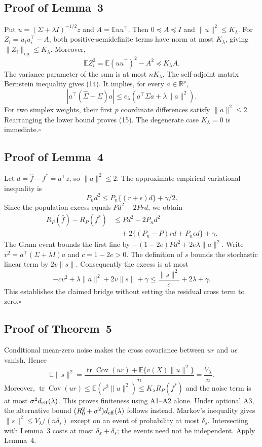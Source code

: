 \documentclass[pdflatex,sn-mathphys-ay]{sn-jnl}
\theoremstyle{remark}\newtheorem{remark}[theorem]{Remark}
\newcommand{\E}{\mathbb E}
\newcommand{\R}{\mathbb R}
\newcommand{\op}{\mathrm{op}}
\newcommand{\tr}{\operatorname{tr}}
\begin{document}
\subsection{Proof of Lemma~3}
Put $u=(\Sigma+\lambda I)^{-1/2}z$ and $A=\E uu^\top$. Then $0\preceq A\preceq I$ and $\|u\|^2\leq K_\lambda$. For $Z_i=u_iu_i^\top-A$, both positive-semidefinite terms have norm at most $K_\lambda$, giving $\|Z_i\|_{\op}\leq K_\lambda$. Moreover,
\[
 \E Z_i^2=\E(uu^\top)^2-A^2\preceq K_\lambda A.
\]
The variance parameter of the sum is at most $nK_\lambda$. The self-adjoint matrix Bernstein inequality \citep{tropp} gives (14). It implies, for every $a\in\R^p$,
\[
 |a^\top(\hat\Sigma-\Sigma)a|
 \leq e_\lambda(a^\top\Sigma a+\lambda\|a\|^2).
\]
For two simplex weights, their first $p$ coordinate differences satisfy $\|a\|^2\leq2$. Rearranging the lower bound proves (15). The degenerate case $K_\lambda=0$ is immediate.\hfill$\square$

\subsection{Proof of Lemma~4}
Let $d=\hat f-f^*=a^\top z$, so $\|a\|^2\leq2$. The approximate empirical variational inequality is
\[
 P_n d^2\leq P_n\{(r+\epsilon)d\}+\gamma/2.
\]
Since the population excess equals $Pd^2-2Prd$, we obtain
\begin{align*}
 R_P(\hat f)-R_P(f^*)
 &\leq Pd^2-2P_nd^2\\
 &\quad+2\{(P_n-P)rd+P_n\epsilon d\}+\gamma.
\end{align*}
The Gram event bounds the first line by
$-(1-2e)Pd^2+2e\lambda\|a\|^2$.
Write $v^2=a^\top(\Sigma+\lambda I)a$ and $c=1-2e>0$. The definition of $s$ bounds the stochastic linear term by $2v\|s\|$. Consequently the excess is at most
\[
 -cv^2+\lambda\|a\|^2+2v\|s\|+\gamma
 \leq\frac{\|s\|^2}{c}+2\lambda+\gamma.
\]
This establishes the claimed bridge without setting the residual cross term to zero.\hfill$\square$

\subsection{Proof of Theorem~5}
Conditional mean-zero noise makes the cross covariance between $ur$ and $u\epsilon$ vanish. Hence
\[
 \E\|s\|^2=\frac{\tr\operatorname{Cov}(ur)+\E\{v(X)\|u\|^2\}}{n}=\frac{V_\lambda}{n}.
\]
Moreover, $\tr\operatorname{Cov}(ur)\leq\E(r^2\|u\|^2)\leq K_\lambda R_P(f^*)$ and the noise term is at most $\sigma^2d_{\rm eff}(\lambda)$. This proves finiteness using A1--A2 alone. Under optional A3, the alternative bound $(R_0^2+\sigma^2)d_{\rm eff}(\lambda)$ follows instead. Markov's inequality gives $\|s\|^2\leq V_\lambda/(n\delta_s)$ except on an event of probability at most $\delta_s$. Intersecting with Lemma~3 costs at most $\delta_x+\delta_s$; the events need not be independent. Apply Lemma~4.
\end{document}
